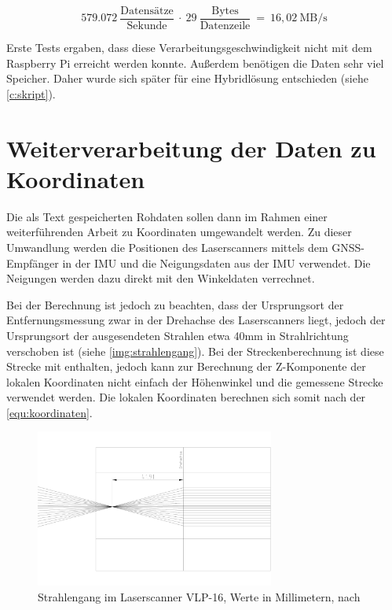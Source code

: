 \documentclass[a4paper,12pt,bibliography=totoc, listof=totoc,titlepage,pointlessnumbers]{scrreprt}
\begin{document}
\begin{equation}
579.072~\frac{\text{Datens\"{a}tze}}{\text{Sekunde}}~\cdot~29~\frac{\text{Bytes}}{\text{Datenzeile}}~=~16,02~\text{MB/s}
\label{equ:Datenrate}
\end{equation}

Erste Tests ergaben, dass diese Verarbeitungsgeschwindigkeit nicht mit dem Raspberry Pi erreicht werden konnte. Außerdem benötigen die Daten sehr viel Speicher. Daher wurde sich später für eine Hybridlösung entschieden (siehe \autoref{c:skript}).

\section{Weiterverarbeitung der Daten zu Koordinaten}
Die als Text gespeicherten Rohdaten sollen dann im Rahmen einer weiterführenden Arbeit zu Koordinaten umgewandelt werden. Zu dieser Umwandlung werden die Positionen des Laser\-scan\-ners mittels dem GNSS-Empfänger in der IMU und die Neigungsdaten aus der IMU verwendet. Die Neigungen werden dazu direkt mit den Winkeldaten verrechnet.

Bei der Berechnung ist jedoch zu beachten, dass der Ursprungsort der Entfernungsmessung zwar in der Drehachse des Laser\-scan\-ners liegt, jedoch der Ursprungsort der ausgesendeten Strahlen etwa 40mm in Strahlrichtung verschoben ist (siehe \autoref{img:strahlengang}). Bei der Streckenberechnung ist diese Strecke mit enthalten, jedoch kann zur Berechnung der Z-Komponente der lokalen Koordinaten nicht einfach der Höhenwinkel und die gemessene Strecke verwendet werden. Die lokalen Koordinaten berechnen sich somit nach der \autoref{equ:koordinaten}.

\begin{figure}
 \centering
 \includegraphics[width=0.7\textwidth]{./img/Strahlengang.png}
 \caption{Strahlengang im Laser\-scan\-ner VLP-16, Werte in Millimetern, nach 
\citet{vlpCAD}}
 \label{img:strahlengang}
\end{figure}
\end{document}

